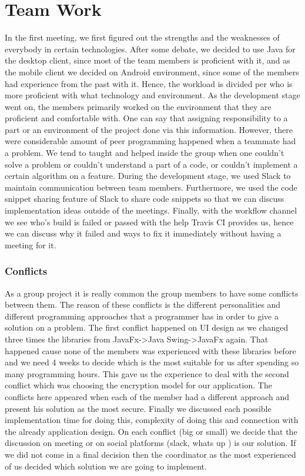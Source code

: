 \documentclass[11pt,a4paper]{report}
\begin{document}
\chapter{Team Work}
In the first meeting, we first figured out the strengths and the weaknesses of everybody in certain technologies. After some debate, we decided to use Java for the desktop client, since most of the team members is proficient with it, and as the mobile client we decided on Android environment, since some of the members had experience from the past with it. Hence, the workload is divided per who is more proficient with what technology and environment.
As the development stage went on, the members primarily worked on the environment that they are proficient and comfortable with. One can say that assigning responsibility to a part or an environment of the project done via this information. However, there were considerable amount of peer programming happened when a teammate had a problem. We tend to taught and helped inside the group when one couldn’t solve a problem or couldn’t understand a part of a code, or couldn’t implement a certain algorithm on a feature.
During the development stage, we used Slack to maintain communication between team members. Furthermore, we used the code snippet sharing feature of Slack to share code snippets so that we can discuss implementation ideas outside of the meetings. Finally, with the workflow channel we see who’s build is failed or passed with the help Travis CI provides us, hence we can discuss why it failed and ways to fix it immediately without having a meeting for it.

\subsection{Conflicts}
As a group project it is really common the group members to have some conflicts between them. The reason of these conflicts is the different personalities and different programming approaches that a programmer has in order to give a solution on a problem. The first conflict happened on UI design as we changed three times the libraries from JavaFx->Java Swing->JavaFx again. That happened cause none of the members was experienced with these libraries before and we need 4 weeks to decide which is the most suitable for us after spending so many programming hours. This gave us the experience to deal with the second conflict which was choosing the encryption model for our application. The conflicts here appeared when each of the member had a different approach and present his solution as the most secure. Finally we discussed each possible implementation time for doing this, complexity of doing this and connection with the already application design. On each conflict (big or small) we decide that the discussion on meeting or on social platforms (slack, whats up ) is our solution. If we did not come in a final decision then the coordinator as the most experienced of us decided which solution we are going to implement.
\end{document}
